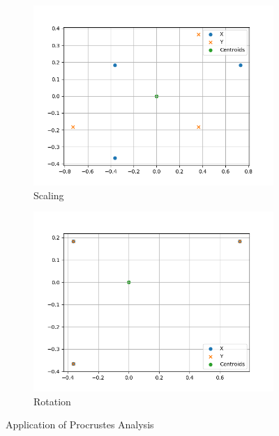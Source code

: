 \begin{figure}[h]
    \begin{subfigure}[b]{0.475\textwidth}   
        \centering 
        \includegraphics[width=\textwidth]{figures/procrustes/procrustes_ex3}
        \caption[]
        {{\small Scaling}}    
        \label{fig:procrustes_ex_3}
    \end{subfigure}
    \begin{subfigure}[b]{0.475\textwidth}   
        \centering 
        \includegraphics[width=\textwidth]{figures/procrustes/procrustes_ex4}
        \caption[]
        {{\small Rotation}}    
        \label{fig:procrustes_ex_4}
    \end{subfigure}
    \caption[]
    {Application of Procrustes Analysis} 
    \label{fig:procrustes_analysis}
\end{figure}

